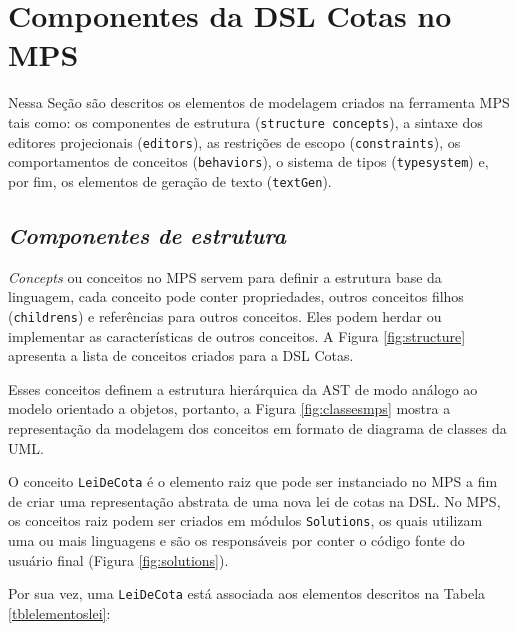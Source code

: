 \section{Componentes da DSL Cotas no \gls{MPS}}
\label{sec:mps}

Nessa Seção são descritos os elementos de modelagem criados na ferramenta \gls{MPS} tais como: os componentes de estrutura (\texttt{structure concepts}), a sintaxe dos editores projecionais (\texttt{editors}), as restrições de escopo (\texttt{constraints}), os comportamentos de conceitos (\texttt{behaviors}), o sistema de tipos (\texttt{typesystem}) e, por fim, os elementos de geração de texto (\texttt{textGen}).

\subsection{\textit{Componentes de estrutura}}
\label{sub:sec:estrutura}

\textit{Concepts} ou conceitos no \gls{MPS} servem para definir a estrutura base da linguagem, cada conceito pode conter propriedades, outros conceitos filhos (\texttt{childrens}) e referências para outros conceitos. Eles podem herdar ou implementar as características de outros conceitos. A Figura \ref{fig:structure} apresenta a lista de conceitos criados para a DSL Cotas.




\newpage
Esses conceitos definem a estrutura hierárquica da \gls{AST} de modo análogo ao modelo orientado a objetos, portanto, a Figura \ref{fig:classesmps} mostra a representação da modelagem dos conceitos em formato de diagrama de classes da \gls{UML}.




\newpage
O conceito \texttt{LeiDeCota} é o elemento raiz  que pode ser instanciado no \gls{MPS} a fim de criar uma representação abstrata de uma nova lei de cotas na DSL. No \gls{MPS}, os conceitos raiz podem ser criados em módulos \texttt{Solutions}, os quais utilizam uma ou mais linguagens e são os responsáveis por conter o código fonte do usuário final (Figura \ref{fig:solutions}).




Por sua vez, uma \texttt{LeiDeCota} está associada aos elementos descritos na Tabela \ref{tblelementoslei}:



